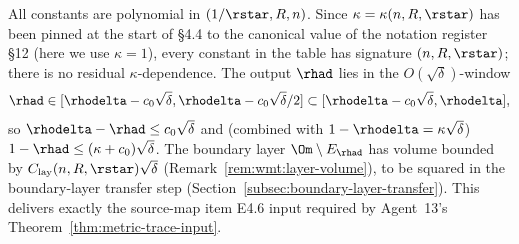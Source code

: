 All constants are polynomial in $(1/\rstar, R, n)$. Since
$\kappa=\kappa(n,R,\rstar)$ has been pinned at the start of \S4.4 to
the canonical value of the notation register \S12 (here we use
$\kappa=1$), every constant in the table has signature
$(n,R,\rstar)$; there is no residual $\kappa$-dependence. The output
$\rhad$ lies in the $O(\sqrt{\delta})$-window
\[
   \rhad\in[\rhodelta-c_0\sqrt{\delta},\rhodelta-c_0\sqrt{\delta}/2]
   \subset[\rhodelta-c_0\sqrt{\delta},\rhodelta],
\]
so $\rhodelta-\rhad\le c_0\sqrt{\delta}$ and (combined with
$1-\rhodelta=\kappa\sqrt{\delta}$)
$1-\rhad\le(\kappa+c_0)\sqrt{\delta}$. The boundary layer
$\Om\setminus E_\rhad$ has volume bounded by
$C_{\mathrm{lay}}(n,R,\rstar)\sqrt{\delta}$
(Remark~\ref{rem:wmt:layer-volume}), to be squared in the
boundary-layer transfer step
(Section~\ref{subsec:boundary-layer-transfer}). This delivers exactly
the source-map item E4.6 input required by Agent~13's
Theorem~\ref{thm:metric-trace-input}.
